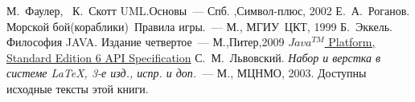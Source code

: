 ﻿
\begin{thebibliography}{2010}

М.~Фаулер, ~К.~Скотт UML.Основы~---
Спб. ,Символ-плюс, 2002
\label{roganov}
Е.~А.~Роганов. Морской бой(кораблики)~Правила игры.~---
М., МГИУ~ЦКТ, 1999
Б.~Эккель. Философия JAVA. Издание четвертое~--- М.,Питер,2009
\href{http://download.oracle.com/javase/6/docs/api/}{$Java^{TM}$ Platform, Standard Edition 6
API Specification}
С.~М.~Львовский.
{\em Набор и верстка в системе \LaTeX, 3-е изд., испр. и доп.}~---
М., МЦНМО, 2003. Доступны исходные тексты этой книги.

\end{thebibliography}

\endinput
